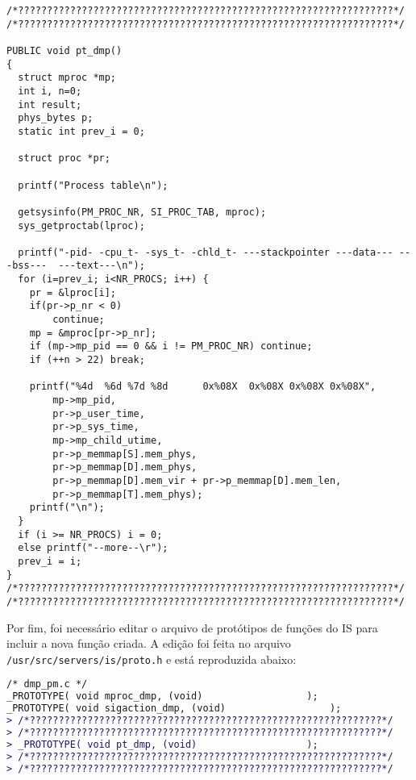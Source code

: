 \documentclass[brazil, a4paper]{scrartcl}
\begin{document}
\begin{lstlisting}[style=customc]
/*?????????????????????????????????????????????????????????????????*/
/*?????????????????????????????????????????????????????????????????*/

PUBLIC void pt_dmp()
{
  struct mproc *mp;
  int i, n=0;
  int result;
  phys_bytes p;
  static int prev_i = 0;

  struct proc *pr;

  printf("Process table\n");

  getsysinfo(PM_PROC_NR, SI_PROC_TAB, mproc);
  sys_getproctab(lproc);

  printf("-pid- -cpu_t- -sys_t- -chld_t- ---stackpointer ---data--- ---bss---  ---text---\n");
  for (i=prev_i; i<NR_PROCS; i++) {
    pr = &lproc[i];
    if(pr->p_nr < 0)
        continue;
    mp = &mproc[pr->p_nr];
  	if (mp->mp_pid == 0 && i != PM_PROC_NR) continue;
  	if (++n > 22) break;

  	printf("%4d  %6d %7d %8d      0x%08X  0x%08X 0x%08X 0x%08X", 
  		mp->mp_pid,
  		pr->p_user_time,
  		pr->p_sys_time,
  		mp->mp_child_utime,
  		pr->p_memmap[S].mem_phys,
  		pr->p_memmap[D].mem_phys,
  		pr->p_memmap[D].mem_vir + pr->p_memmap[D].mem_len,
  		pr->p_memmap[T].mem_phys);
  	printf("\n");
  }
  if (i >= NR_PROCS) i = 0;
  else printf("--more--\r");
  prev_i = i;
}
/*?????????????????????????????????????????????????????????????????*/
/*?????????????????????????????????????????????????????????????????*/
\end{lstlisting}

Por fim, foi necessário editar o arquivo de protótipos de funções do IS
para incluir a nova função criada. A edição foi feita no arquivo 
\texttt{/usr/src/servers/is/proto.h} e está reproduzida abaixo:
\begin{lstlisting}[language=diff]
/* dmp_pm.c */
_PROTOTYPE( void mproc_dmp, (void)					);
_PROTOTYPE( void sigaction_dmp, (void)					);
> /*?????????????????????????????????????????????????????????????*/
> /*?????????????????????????????????????????????????????????????*/
> _PROTOTYPE( void pt_dmp, (void)					);
> /*?????????????????????????????????????????????????????????????*/
> /*?????????????????????????????????????????????????????????????*/
\end{lstlisting}
\end{document}
